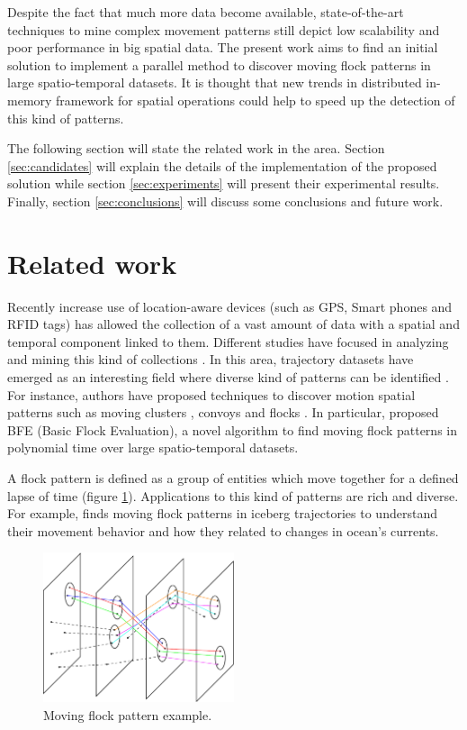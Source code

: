 \documentclass[12pt]{scrartcl}
\begin{document}
Despite the fact that much more data become available, state-of-the-art techniques to mine complex movement patterns still depict low scalability and poor performance in big spatial data.  The present work aims to find an initial solution to implement a parallel method to discover moving flock patterns in large spatio-temporal datasets.  It is thought that new trends in distributed in-memory framework for spatial operations could help to speed up the detection of this kind of patterns.

The following section will state the related work in the area.  Section \ref{sec:candidates} will explain the details of the implementation of the proposed solution while section \ref{sec:experiments} will present their experimental results. Finally, section \ref{sec:conclusions} will discuss some conclusions and future work. 

\section{Related work}
Recently increase use of location-aware devices (such as GPS, Smart phones and RFID tags) has allowed the collection of a vast amount of data with a spatial and temporal component linked to them.  Different studies have focused in analyzing and mining this kind of collections \citep{leung_knowledge_2010, miller_geographic_2001}.  In this area, trajectory datasets have emerged as an interesting field where diverse kind of patterns can be identified \citep{zheng_computing_2011, vieira_spatio-temporal_2013}.  For instance, authors have proposed techniques to discover motion spatial patterns such as moving clusters \citep{kalnis_discovering_2005}, convoys \citep{jeung_discovery_2008} and flocks \citep{benkert_reporting_2008, gudmundsson_computing_2006}.  In particular, \cite{vieira_-line_2009} proposed BFE (Basic Flock Evaluation), a novel algorithm to find moving flock patterns in polynomial time over large spatio-temporal datasets.  
 
A flock pattern is defined as a group of entities which move together for a defined lapse of time \citep{benkert_reporting_2008} (figure \ref{fig:flock}).  Applications to this kind of patterns are rich and diverse.  For example, \citep{calderon_romero_mining_2011} finds moving flock patterns in iceberg trajectories to understand their movement behavior and how they related to changes in ocean's currents. 

\begin{figure}
 \centering
 \includegraphics[width=0.5\textwidth]{./figures/flock}
 \caption{Moving flock pattern example.}
 \label{fig:flock}
\end{figure}
 
\end{document}
